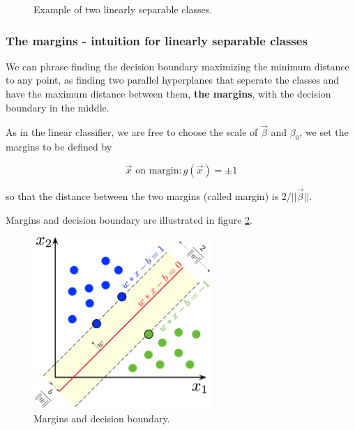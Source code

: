 \begin{figure}[!htb]
    \centering
    
    \caption{Example of two linearly separable classes.}
    \label{fig:svm_simple}
\end{figure}


\subsubsection{The margins - intuition for linearly separable classes}
We can phrase finding the decision boundary maximizing the minimum distance to any point,
as finding two parallel hyperplanes that seperate the classes and have the maximum distance
between them, \textbf{the margins}, with the decision boundary in the middle.

As in the linear classifier, we are free to choose the scale of $\vec{\beta}$ and $\beta_0$,
we set the margins to be defined by

\begin{equation}
    \vec{x} \text{ on margin}: g(\vec{x}) = \pm 1
\end{equation}

so that the distance between the two margins (called margin) is $2 / ||\vec{\beta}||$.



Margins and decision boundary are illustrated in figure \ref{fig:svm_margin}.

\begin{figure}[!htb]
    \centering
    \includegraphics[width=0.6\textwidth]{figures/svm_margin.png}
    \caption{Margins and decision boundary.}
    \label{fig:svm_margin}
\end{figure}


